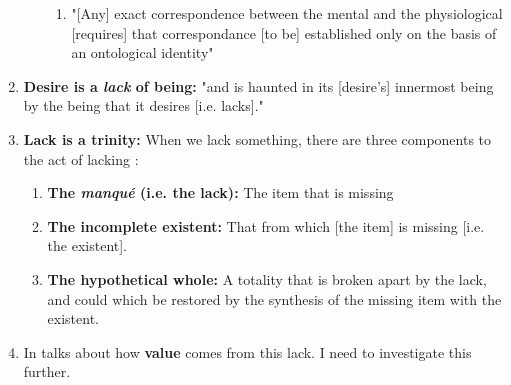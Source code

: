 \begin{enumerate}
\begin{enumerate}
\begin{enumerate}
      \item "[Any] exact correspondence between the mental and the physiological [requires] that correspondance [to be] established only on the basis of an ontological identity" \autocite[139]{sartre}
    \end{enumerate}
  \end{enumerate}
  \item \textbf{Desire is a \emph{lack} of being:} "and is haunted in its [desire's] innermost being by the being that it desires [i.e. lacks]." \autocite[140]{sartre}
  \item \textbf{Lack is a trinity:} When we lack something, there are three components to the act of lacking \autocite[138]{sartre}:
  \begin{enumerate}
    \item \textbf{The \emph{manqué} (i.e. the lack):} The item that is missing
    \item \textbf{The incomplete existent:} That from which [the item] is missing [i.e. the existent].
    \item \textbf{The hypothetical whole:} A totality that is broken apart by the lack, and could which be restored by the synthesis of the missing item with the existent.
  \end{enumerate}
  \item In \autocite[139]{sartre} talks about how \textbf{value} comes from this lack. I need to investigate this further.


\end{enumerate}
